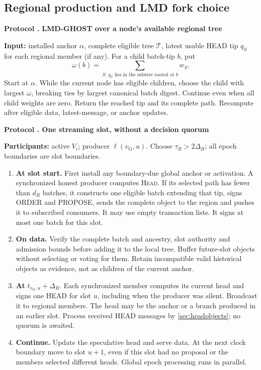 \documentclass[11pt,a4paper,onecolumn]{article}
\newcommand{\gv}{v_{\mathrm G}}
\newcommand{\Proc}[1]{\textnormal{\textsc{#1}}}
\theoremstyle{remark}\newtheorem{example}[definition]{Example}
\newcounter{protocol}
\newenvironment{protocol}[2]{\refstepcounter{protocol}\label{#1}\begin{mdframed}[nobreak=true,linewidth=.6pt,skipabove=10pt,skipbelow=10pt,innertopmargin=8pt,innerbottommargin=8pt]\small\raggedright\noindent\textbf{Protocol \theprotocol. #2}\par\smallskip}{\end{mdframed}}
\begin{document}
\subsection{Regional production and LMD fork choice}\label{sec:regional}
\begin{protocol}{alg:head}{LMD-GHOST over a node's available regional tree}
\textbf{Input:} installed anchor $\alpha$, complete eligible tree $\mathcal T$,
latest usable HEAD tip $q_S$ for each regional member (if any).
For a child batch-tip $b$, put
\[
 \omega(b)=\sum_{S:\,q_S\text{ lies in the subtree rooted at }b}w_S.
\]
Start at $\alpha$. While the current node has eligible children, choose the
child with largest $\omega$, breaking ties by largest canonical batch digest.
Continue even when all child weights are zero. Return the reached tip and its
complete path. Recompute after eligible data, latest-message, or anchor updates.
\end{protocol}

\begin{protocol}{alg:regional}{One streaming slot, without a decision quorum}
\textbf{Participants:} active $V_i$; producer $\ell(\gv,u)$.
Choose $\tau_R>2\Delta_R$; all epoch boundaries are slot boundaries.
\begin{enumerate}[label=\textbf{R\arabic*.}]
\item \textbf{At slot start.} First install any boundary-due global anchor or
activation. A synchronized honest producer computes \Proc{Head}. If its
selected path has fewer than $d_R$ batches, it constructs one eligible batch
extending that tip, signs ORDER and PROPOSE, sends the complete object to the
region and pushes it to subscribed consumers. It may use empty transaction
lists. It signs at most one batch for this slot.
\item \textbf{On data.} Verify the complete batch and ancestry, slot authority
and admission bounds before adding it to the local tree. Buffer future-slot
objects without selecting or voting for them. Retain incompatible valid
historical objects as evidence, not as children of the current anchor.
\item \textbf{At }$t_{\gv,u}+\Delta_R$. Each synchronized member computes its
current head and signs one HEAD for slot $u$, including when the producer was
silent. Broadcast it to regional members. The head may be the anchor or a
branch produced in an earlier slot. Process received HEAD messages by
\cref{sec:headobjects}; no quorum is awaited.
\item \textbf{Continue.} Update the speculative head and serve data. At the
next clock boundary move to slot $u+1$, even if this slot had no proposal or
the members selected different heads. Global epoch processing runs in parallel.
\end{enumerate}
\end{protocol}
\end{document}
